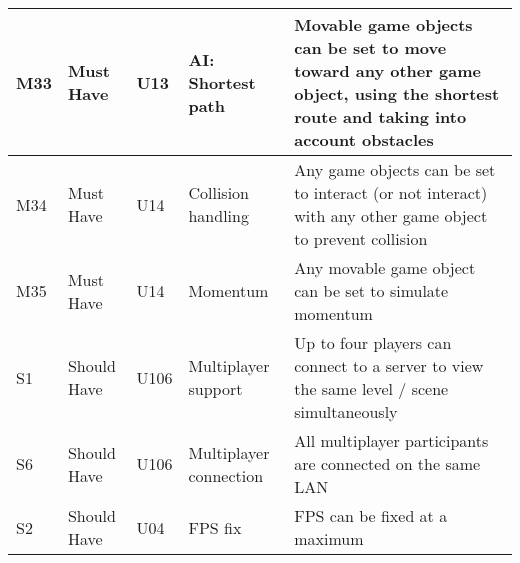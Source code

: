 \documentclass{article} %
\begin{document}
\begin{longtable}{|p{}|p{}|p{}|p{}|p{}|}
    M33 & Must Have & U13 & AI: Shortest path & Movable game objects can be set to move toward any other game object, using the shortest route and taking into account obstacles \\ \hline
    M34 & Must Have & U14 & Collision handling & Any game objects can be set to interact (or not interact) with any other game object to prevent collision \\ \hline
    M35 & Must Have & U14 & Momentum & Any movable game object can be set to simulate momentum \\ \hline
    S1 & Should Have             & U106 & Multiplayer support & Up to four players can connect to a server to view the same level / scene simultaneously \\ \hline
    S6 & Should Have & U106 & Multiplayer connection & All multiplayer participants are connected on the same LAN \\ \hline
    S2       & Should Have & U04 & FPS fix  & FPS can be fixed at a maximum  \\ \hline
\end{longtable}
\newpage
\end{document}
